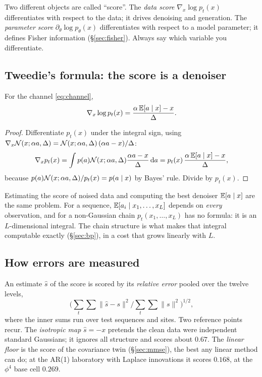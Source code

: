 \begin{caution}
Two different objects are called ``score''. The \emph{data score} $\nabla_x\log p_t(x)$ differentiates with
respect to the data; it drives denoising and generation. The \emph{parameter score}
$\partial_\theta\log p_\theta(x)$ differentiates with respect to a model parameter; it defines Fisher
information (\S\ref{sec:fisher}). Always say which variable you differentiate.
\end{caution}

\subsection{Tweedie's formula: the score is a denoiser}\label{sec:tweedie}

\begin{proposition}[Tweedie]
For the channel \eqref{eq:channel},
\begin{equation}\label{eq:tweedie}
  \nabla_x\log p_t(x)=\frac{\alpha\,\mathbb{E}[a\mid x]-x}{\Delta}.
\end{equation}
\end{proposition}
\begin{proof}
Differentiate $p_t(x)$ under the integral sign, using
$\nabla_x\mathcal{N}(x;\alpha a,\Delta)=\mathcal{N}(x;\alpha a,\Delta)\,(\alpha a-x)/\Delta$:
\[
  \nabla_xp_t(x)=\int p(a)\mathcal{N}(x;\alpha a,\Delta)\frac{\alpha a-x}{\Delta}\,\mathrm{d} a
  =p_t(x)\,\frac{\alpha\,\mathbb{E}[a\mid x]-x}{\Delta},
\]
because $p(a)\mathcal{N}(x;\alpha a,\Delta)/p_t(x)=p(a\mid x)$ by Bayes' rule. Divide by $p_t(x)$.
\end{proof}

\begin{keyidea}
Estimating the score of noised data and computing the best denoiser $\mathbb{E}[a\mid x]$ are the same problem. For a
sequence, $\mathbb{E}[a_i\mid x_1,\dots,x_L]$ depends on \emph{every} observation, and for a non-Gaussian chain
$p_t(x_1,\dots,x_L)$ has no formula: it is an $L$-dimensional integral. The chain structure is what makes
that integral computable exactly (\S\ref{sec:bp}), in a cost that grows linearly with $L$.
\end{keyidea}

\subsection{How errors are measured}

An estimate $\hat s$ of the score is scored by its \emph{relative error} pooled over the twelve levels,
\[
  \Big(\sum_t\sum\|\hat s-s\|^2\Big/\sum_t\sum\|s\|^2\Big)^{1/2},
\]
where the inner sums run over test sequences and sites. Two reference points recur. The \emph{isotropic map} $\hat s=-x$ pretends the clean data were
independent standard Gaussians; it ignores all structure and scores about $0.67$. The \emph{linear floor} is
the score of the covariance twin (\S\ref{sec:mmse}), the best any linear method can do; at the AR(1)
laboratory with Laplace innovations it scores $0.168$, at the $\phi^4$ base cell $0.269$.

